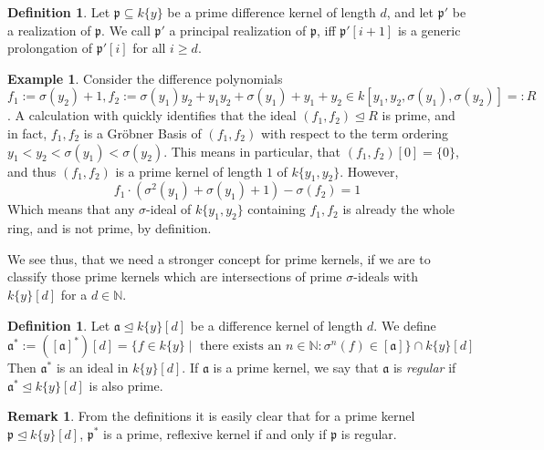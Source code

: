 \documentclass{article}
\def\N{\mathbb{N}}
\def\a{\mathfrak{a}}
\def\p{\mathfrak{p}}
\def\s{\sigma}
\theoremstyle{definition}
\newtheorem{ex}[Satz]{Example}
\newtheorem{rem}[Satz]{Remark}
\newtheorem{defn}[Satz]{Definition}
\begin{document}
\begin{defn}
Let $\p \subseteq k\{y\}$ be a prime difference kernel of length $d$, and let $\p'$ be a realization of $\p$. We call $\p'$ a principal realization of $\p$, iff $\p'[i+1]$ is a generic prolongation of $\p'[i]$ for all $i \geq d$.
\end{defn}

\begin{ex}
Consider the difference polynomials $f_1 := \s(y_2) + 1, f_2:= \s(y_1)y_2 + y_1y_2 + \s(y_1) + y_1 + y_2 \in k[y_1,y_2,\s(y_1),\s(y_2)] =: R$.
A calculation with \cite{M2} quickly identifies that the ideal $(f_1,f_2) \unlhd R$ is prime, and in fact, $f_1,f_2$ is a Gr\"{o}bner Basis of $(f_1,f_2)$ with respect to the
term ordering $y_1 < y_2 < \s(y_1) < \s(y_2)$. This means in particular, that $(f_1,f_2)[0] = \{0\}$, and thus $(f_1,f_2)$ is a prime kernel of length $1$ of $k\{y_1,y_2\}$. However,
\[ f_1 \cdot (\s^2(y_1) + \s(y_1) + 1 ) - \s(f_2) = 1 \]
Which means that any $\s$-ideal of $k\{y_1,y_2\}$ containing $f_1, f_2$ is already the whole ring, and is not prime, by definition.
\end{ex}

We see thus, that we need a stronger concept for prime kernels, if we are to classify those prime kernels which are intersections of prime $\s$-ideals with $k\{y\}[d]$ for a $d \in \N$. 

\begin{defn}
Let $\a \unlhd k\{y\}[d]$ be a difference kernel of length $d$. We define 
\[\a^* := ([\a]^*)[d] = \{ f \in k\{y\} \mid \text{ there exists an } n \in \N: \s^n(f) \in [\a] \} \cap k\{y\}[d] \]
Then $\a^*$ is an ideal in $k\{y\}[d]$. If $\a$ is a prime kernel, we say that $\a$ is \emph{regular} if $\a^* \unlhd k\{y\}[d]$ is also prime. 
\end{defn}

\begin{rem}\label{regular->kernel}
From the definitions it is easily clear that for a prime kernel $\p \unlhd k\{y\}[d]$, $\p^*$ is a prime, reflexive kernel if and only if $\p$ is regular. 
\end{rem}
\end{document}

